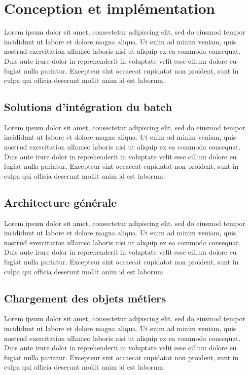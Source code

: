 \documentclass[a4paper, 12pt]{report}
\begin{document}
\section{Conception et implémentation}

Lorem ipsum dolor sit amet, consectetur adipiscing elit, sed do eiusmod tempor incididunt ut labore et dolore magna aliqua. Ut enim ad minim veniam, quis nostrud exercitation ullamco laboris nisi ut aliquip ex ea commodo consequat. Duis aute irure dolor in reprehenderit in voluptate velit esse cillum dolore eu fugiat nulla pariatur. Excepteur sint occaecat cupidatat non proident, sunt in culpa qui officia deserunt mollit anim id est laborum.

\subsection{Solutions d'intégration du batch}

Lorem ipsum dolor sit amet, consectetur adipiscing elit, sed do eiusmod tempor incididunt ut labore et dolore magna aliqua. Ut enim ad minim veniam, quis nostrud exercitation ullamco laboris nisi ut aliquip ex ea commodo consequat. Duis aute irure dolor in reprehenderit in voluptate velit esse cillum dolore eu fugiat nulla pariatur. Excepteur sint occaecat cupidatat non proident, sunt in culpa qui officia deserunt mollit anim id est laborum.

\subsection{Architecture générale}

Lorem ipsum dolor sit amet, consectetur adipiscing elit, sed do eiusmod tempor incididunt ut labore et dolore magna aliqua. Ut enim ad minim veniam, quis nostrud exercitation ullamco laboris nisi ut aliquip ex ea commodo consequat. Duis aute irure dolor in reprehenderit in voluptate velit esse cillum dolore eu fugiat nulla pariatur. Excepteur sint occaecat cupidatat non proident, sunt in culpa qui officia deserunt mollit anim id est laborum.

\subsection{Chargement des objets métiers}

Lorem ipsum dolor sit amet, consectetur adipiscing elit, sed do eiusmod tempor incididunt ut labore et dolore magna aliqua. Ut enim ad minim veniam, quis nostrud exercitation ullamco laboris nisi ut aliquip ex ea commodo consequat. Duis aute irure dolor in reprehenderit in voluptate velit esse cillum dolore eu fugiat nulla pariatur. Excepteur sint occaecat cupidatat non proident, sunt in culpa qui officia deserunt mollit anim id est laborum.
\end{document}
